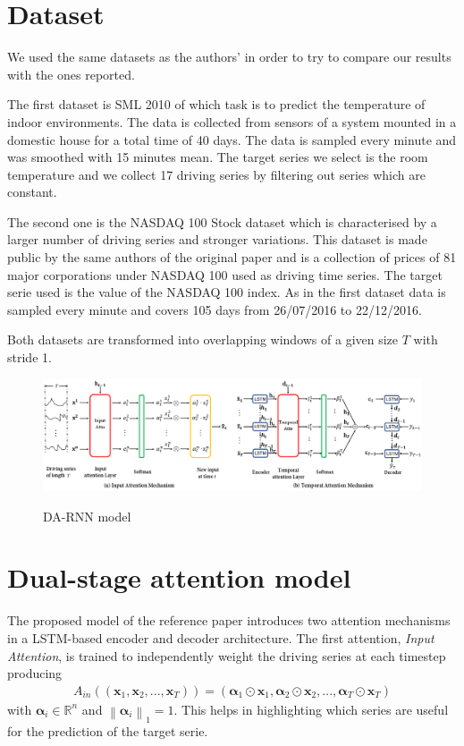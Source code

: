 \documentclass{article}
\newcommand{\norm}[1]{\left\lVert#1\right\rVert}
\begin{document}
\section{Dataset}
\label{sec:retrieval}

We used the same datasets as the authors' in order to try to compare our results
with the ones reported.

The first dataset is SML 2010 of which task is to predict the temperature of indoor 
environments. The data is collected from sensors of a system mounted in a 
domestic house for a total time of 40 days. The data is sampled every minute and 
was smoothed with 15 minutes mean. The target series we select is the room 
temperature and we collect 17 driving series by filtering out series which
are constant.

The second one is the NASDAQ 100 Stock dataset which is characterised by a
larger number of driving series and stronger variations. This dataset is
made public by the same
authors of the original paper and is a collection of prices of 81 major
corporations under NASDAQ 100 used as driving time series. The target serie
used is the value of the NASDAQ 100 index. As in the first dataset data is
sampled every minute and covers 105 days from 26/07/2016 to 22/12/2016.

Both datasets are transformed into overlapping windows of a given size
$T$ with stride 1.

\begin{figure}[h]
\centering
\includegraphics[width=\linewidth]{da-rnn.png} \\
\caption{DA-RNN model}

\label{fig:da-rnn}
\end{figure}


\section{Dual-stage attention model}
\label{sec:da-rnn}

The proposed model of the reference paper introduces two attention
mechanisms in a LSTM-based encoder and decoder architecture. The first
attention, \textit{Input Attention}, is trained to independently weight
the driving series at each timestep producing
\begin{align*}
A_{in}((\mathbf{x}_1, \mathbf{x}_2, ..., \mathbf{x}_T)) =
(\boldsymbol{\alpha}_1 \odot \mathbf{x}_1, \boldsymbol{\alpha}_2 \odot \mathbf{x}_2, ..., \boldsymbol{\alpha}_T \odot \mathbf{x}_T)
\end{align*}
with $\boldsymbol{\alpha}_i \in \mathbb{R}^n$ and $\norm{\boldsymbol{\alpha}_i}_1 = 1$.
This helps in highlighting which series are useful for the prediction of
the target serie.
\end{document}
